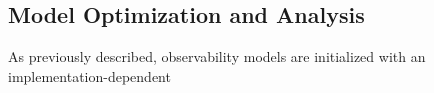 \subsection{Model Optimization and Analysis}

As previously described, observability models are initialized with an implementation-dependent

\subsubsection{}